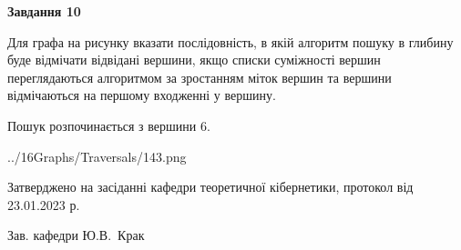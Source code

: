 \documentclass[12pt, ukrainian]{article}
\begin{document}
{\begin {large}
{\begin {center}\textbf{Завдання 10}\end {center}}\par
Для графа на рисунку вказати послідовність, в якій алгоритм пошуку в глибину буде відмічати відвідані вершини, якщо списки суміжності вершин переглядаються алгоритмом за зростанням міток вершин та вершини відмічаються на першому вход\-женні у вершину.\par
Пошук розпочинається з вершини 6.\par

\begin{center}
	{../16Graphs/Traversals/143.png}
\end{center}\par
\newpage


\end {large}
}
{\smallskip \begin {small} Затверджено на засіданні кафедри теоретичної кібернетики, протокол  від   23.01.2023 р.\par\smallskip\smallskip
{\parbox {6.5 cm}{Зав. кафедри \dotfill Ю.В.~Крак}} \end{small}}
\end{document}
